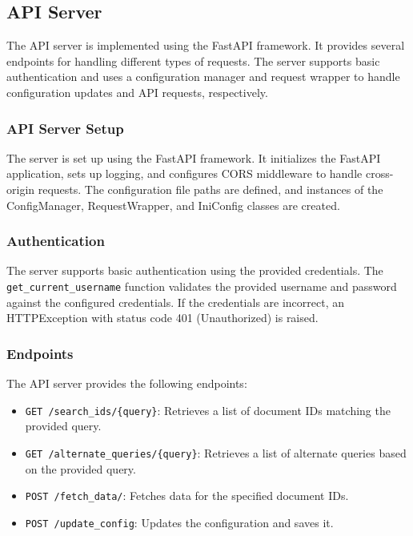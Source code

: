 \documentclass{article}
\begin{document}
\subsection{API Server}

The API server is implemented using the FastAPI framework. It provides several endpoints for handling different types of requests. The server supports basic authentication and uses a configuration manager and request wrapper to handle configuration updates and API requests, respectively.

\subsubsection{API Server Setup}

The server is set up using the FastAPI framework. It initializes the FastAPI application, sets up logging, and configures CORS middleware to handle cross-origin requests. The configuration file paths are defined, and instances of the ConfigManager, RequestWrapper, and IniConfig classes are created.

\subsubsection{Authentication}

The server supports basic authentication using the provided credentials. The \texttt{get\_current\_username} function validates the provided username and password against the configured credentials. If the credentials are incorrect, an HTTPException with status code 401 (Unauthorized) is raised.

\subsubsection{Endpoints}

The API server provides the following endpoints:

\begin{itemize}
    \item \texttt{GET /search\_ids/\{query\}}: Retrieves a list of document IDs matching the provided query.
    \item \texttt{GET /alternate\_queries/\{query\}}: Retrieves a list of alternate queries based on the provided query.
    \item \texttt{POST /fetch\_data/}: Fetches data for the specified document IDs.
    \item \texttt{POST /update\_config}: Updates the configuration and saves it.
\end{itemize}
\end{document}
